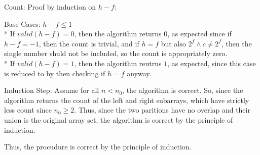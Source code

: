 \documentclass[letterpaper, reqno, 11pt]{article}
\begin{document}
\begin{description}
	\pagebreak
	\item{Count:}
	Proof by induction on $h-f$:
	\begin{description}
		\item{Base Cases:} $h-f\leq1$\\*
		If $valid(h-f)=0$, then the algorithm returns $0$, as expected
		since if $h-f=-1$, then the count is trivial, and if
		$h=f$ but also $2^f\land c\neq 2^f$, then the single number
		shuld not be included, so the count is appropriately zero.\\*
		If $valid(h-f)=1$, then the algorithm reutrns $1$, as expected,
		since this case is reduced to by then checking if $h=f$ anyway.
		\item{Induction Step:}
		Assume for all $n<n_0$, the algorithm is correct.
		So, since the algorithm returns the count of the left and right
		subarrays, which have strictly less count since $n_0\geq 2$.
		Thus, since the two paritions have no overlap and their union
		is the original array set, the algorithm is correct by the principle
		of induction.
	\end{description}
	Thus, the procudure is correct by the principle of induction.


\end{description}
\end{document}
